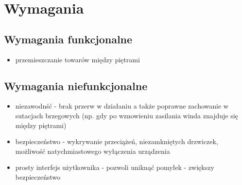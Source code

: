 \documentclass[a4paper,11pt]{article}
\begin{document}
\section{Wymagania}
    \subsection{Wymagania funkcjonalne}
    	\begin{itemize}
    		\item przemieszczanie towarów między piętrami
    	\end{itemize}
    \subsection{Wymagania niefunkcjonalne}
    	\begin{itemize}
    		\item niezawodnść - brak przerw w działaniu a także poprawne zachowanie w sutacjach brzegowych
    		 (np. gdy po wznowieniu zasilania winda znajduje się między piętrami)
    		\item bezpieczeństwo - wykrywanie przeciążeń, niezamkniętych drzwiczek, możliwość natychmiastowego wyłączenia urządzenia 
    		\item prosty interfejs użytkownika - pozwoli uniknąć pomyłek - zwiększy bezpieczeństwo
    	\end{itemize}
    	
\end{document}
